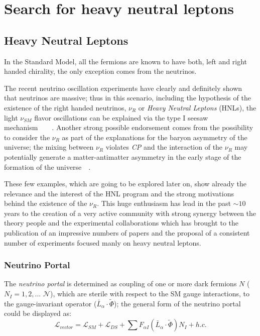 
\part {Search for heavy neutral leptons}


\chapter{Heavy Neutral Leptons} 
\label{Chapter3} 


In the Standard Model, all the fermions are known to have both, left and right handed chirality, the only exception comes from the neutrinos.

The recent neutrino oscillation experiments have clearly and definitely shown that neutrinos are massive; thus in this scenario, including the hypothesis of the existence of the right handed neutrinos, $\nu_{R}$ or \emph{Heavy Neutral Leptons} (HNLs), the light $\nu_{SM}$ flavor oscillations can be explained via the type I seesaw mechanism~\cite{MINKOWSKI1977421}~\cite{gellmann2013complex}~\cite{PhysRevLett.44.912}~\cite{PhysRevD.22.2227}.
Another strong possible endorsement comes from the possibility to consider the $\nu_{R}$ as part of the explanations for the baryon asymmetry of the universe; the mixing between $\nu_{R}$ violates \emph{CP} and the interaction of the $\nu_{R}$ may potentially generate a matter-antimatter asymmetry in the early stage of the formation of the universe~\cite{Canetti_2012}~\cite{KUZMIN198536}.

These few examples, which are going to be explored later on, show already the relevance and the interest of the HNL program and the strong motivations behind the existence of the $\nu_{R}$. This huge enthusiasm has lead in the past $\sim10$ years to the creation of a very active community with strong synergy between the theory people and the experimental collaborations which has brought to the publication of an impressive numbers of papers and the proposal of a consistent number of experiments focused manly on heavy neutral leptons. 

\section{Neutrino Portal} \label{sec:neutrinoPortal}
The \emph{neutrino portal} is determined as coupling of one or more dark fermions $N$ ($N_{I} = 1,2,...$ $\mathcal{N}$), which are sterile with respect to the SM gauge interactions, to the gauge-invariant operator ($\bar{L}_{\alpha}  \cdot \widetilde \Phi$); the general form of the neutrino portal could be displayed as: 
\begin{equation}
\label{eq:neutrinoportal}
\mathcal{L}_{vector} = \mathcal{L}_{SM} + \mathcal{L}_{DS} + \sum F_{\alpha I} (\bar{L}_{\alpha}  \cdot \widetilde \Phi)N_{I} + h.c.
\end{equation}

